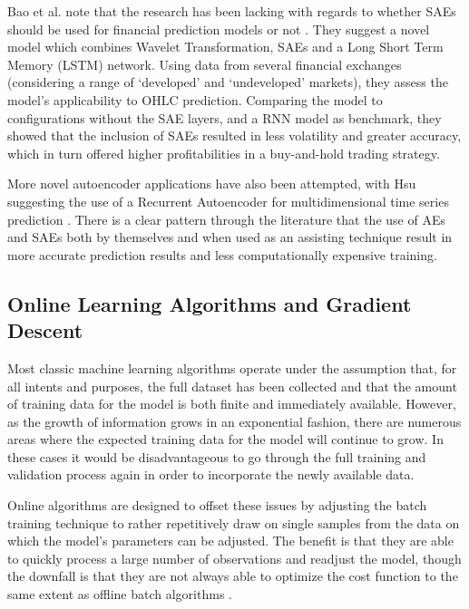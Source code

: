 \documentclass[a4paper,11pt,oneside]{article}
\theoremstyle{plain}
\theoremstyle{definition}
\begin{document}
	Bao et al.  note that the research has been lacking with regards to whether SAEs should be used for 
	financial prediction models or not \cite{Bao}. They suggest a novel model which combines Wavelet Transformation, SAEs 
	and a Long Short Term Memory (LSTM) network. Using data from several financial exchanges (considering a 
	range of ‘developed’ and ‘undeveloped’ markets), they assess the model’s applicability to OHLC prediction. 
	Comparing the model to configurations without the SAE layers, and a RNN model as benchmark, they showed 
	that the inclusion of SAEs resulted in less volatility and greater accuracy, which in turn offered higher profitabilities 
	in a buy-and-hold trading strategy.
	\hfill \break 
	
	More novel autoencoder applications have also been attempted, with Hsu suggesting the use of a 
	Recurrent Autoencoder for multidimensional time series prediction \cite{Hsu}. There is a clear pattern through the literature 
	that the use of AEs and SAEs both by themselves and when used as an assisting technique result in more accurate 
	prediction results and less computationally expensive training.
	
	\subsection{Online Learning Algorithms and Gradient Descent} \label{lr_OGD}
	\hfill
	
	Most classic machine learning algorithms operate under the assumption that, for all intents and purposes, the 
	full dataset has been collected and that the amount of training data for the model is both finite and immediately 
	available. However, as the growth of information grows in an exponential fashion, there are numerous areas where
	the expected training data for the model will continue to grow. In these cases it would be disadvantageous to go 
	through the full training and validation process again in order to incorporate the newly available data.
	\hfill\break
	
	Online algorithms are designed to offset these issues by adjusting the batch training technique to rather 
	repetitively draw on single samples from the data on which the model’s parameters can be adjusted. The benefit 
	is that they are able to quickly process a large number of observations and readjust the model, though the 
	downfall is that they are not always able to optimize the cost function to the same extent as offline batch 
	algorithms \cite{Albers}.
	\hfill\break
	
\end{document}
